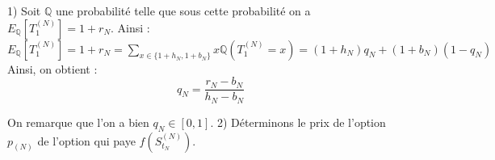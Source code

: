 \documentclass{exam}
\begin{document}
\newcommand{\espace}{\vspace{0.5cm}}
\newcommand{\increment}{\hspace{0.5cm}}

1) Soit $\mathbb{Q}$ une probabilité telle que sous cette probabilité on a $E_{\mathbb{Q}}[T_1^{(N)}] = 1 + r_N$. Ainsi : 
\newline
\espace
$E_{\mathbb{Q}}[T_1^{(N)}] = 1 + r_N=\underset{x \in \{1+h_N,1+b_N\}}{\sum} x \mathbb{Q}(T_1^{(N)}=x)=(1+h_N)q_N + (1+b_N)(1-q_N)$
\newline
\espace
Ainsi, on obtient :
$$\boxed{q_N = \frac{r_N - b_N}{h_N - b_N}}$$

On remarque que l'on a bien $q_N \in [0,1]$.
\newline
\espace
2) Déterminons le prix de l'option $p_{(N)}$ de l'option qui paye $f(S_{t_N}^{(N)})$.
\end{document}
